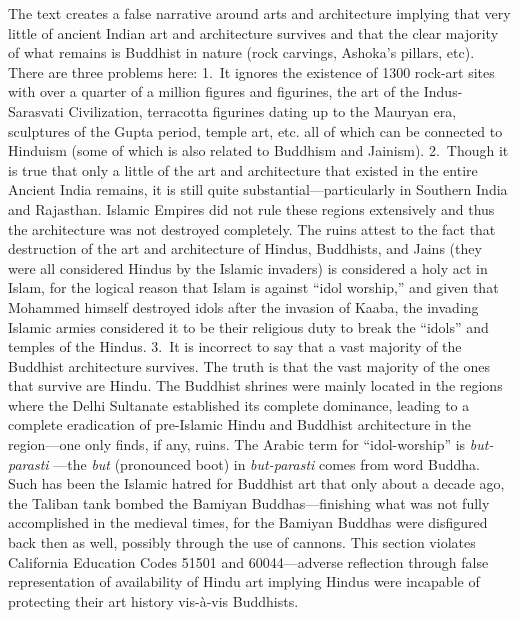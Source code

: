 The text creates a false narrative around arts and architecture implying that very little of ancient Indian art and architecture survives and that the clear majority of what remains is Buddhist in nature (rock carvings, Ashoka’s pillars, etc). There are three problems here: 1.\ It ignores the existence of 1300 rock-art sites with over a quarter of a million figures and figurines, the art of the Indus-Sarasvati Civilization, terracotta figurines dating up to the Mauryan era, sculptures of the Gupta period, temple art, etc. all of which can be connected to Hinduism (some of which is also related to Buddhism and Jainism). 2.\ Though it is true that only a little of the art and architecture that existed in the entire Ancient India remains, it is still quite substantial—particularly in Southern India and Rajasthan. Islamic Empires did not rule these regions extensively and thus the architecture was not destroyed completely. The ruins attest to the fact that destruction of the art and architecture of Hindus, Buddhists, and Jains (they were all considered Hindus by the Islamic invaders) is considered a holy act in Islam, for the logical reason that Islam is against “idol worship,” and given that Mohammed himself destroyed idols after the invasion of Kaaba, the invading Islamic armies considered it to be their religious duty to break the “idols” and temples of the Hindus. 3.\ It is incorrect to say that a vast majority of the Buddhist architecture survives. The truth is that the vast majority of the ones that survive are Hindu. The Buddhist shrines were mainly located in the regions where the Delhi Sultanate established its complete dominance, leading to a complete eradication of pre-Islamic Hindu and Buddhist architecture in the region—one only finds, if any, ruins. The Arabic term for “idol-worship” is \textit{but-parasti} —the \textit{but}  (pronounced boot) in \textit{but-parasti}  comes from word Buddha. Such has been the Islamic hatred for Buddhist art that only about a decade ago, the Taliban tank bombed the Bamiyan Buddhas—finishing what was not fully accomplished in the medieval times, for the Bamiyan Buddhas were disfigured back then as well, possibly through the use of cannons. This section violates California Education Codes 51501 and 60044—adverse reflection through false representation of availability of Hindu art implying Hindus were incapable of protecting their art history vis-à-vis Buddhists.
\eject

